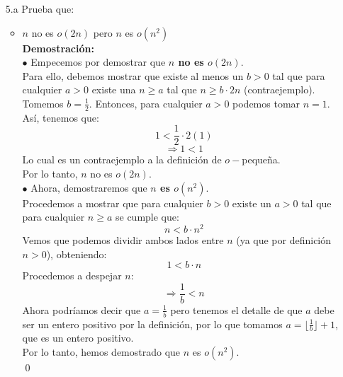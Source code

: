\documentclass[12pt]{article}
\begin{document}
\begin{itemize}
    \item[5.a] Prueba que:
    \begin{itemize}
            \item $n$ no es $o(2n)$ pero $n$ es $o(n^2)$\\
            \textbf{Demostración:}\\
            $\bullet$ Empecemos por demostrar que \textbf{$n$ no es $o(2n)$}.\\
            Para ello, debemos mostrar que existe al menos un $b > 0$ tal que para cualquier $a > 0$ existe una $n \geq a$ tal que $n \geq b \cdot 2n$ (contraejemplo).\\
            Tomemos $b = \frac{1}{2}$. Entonces, para cualquier $a > 0$ podemos tomar $n = 1$. Así, tenemos que:
            \[
            1 < \frac{1}{2} \cdot 2(1)
            \]
            \[
            \Rightarrow 1 < 1
            \]
            Lo cual es un contraejemplo a la definición de $o-$pequeña.\\
            Por lo tanto, $n$ no es $o(2n)$.\\
            $\bullet$ Ahora, demostraremos que \textbf{$n$ es $o(n^2)$}.\\
            Procedemos a mostrar que para cualquier $b > 0$ existe un $a > 0$ tal que para cualquier $n \geq a$ se cumple que:
            \[
            n < b \cdot n^2
            \]
            Vemos que podemos dividir ambos lados entre $n$ (ya que por definición $n > 0$), obteniendo:
            \[
            1 < b \cdot n
            \]
            Procedemos a despejar $n$:
            \[
            \Rightarrow \frac{1}{b} < n
            \]
            Ahora podríamos decir que $a = \frac{1}{b}$ pero tenemos el detalle de que $a$ debe ser un entero positivo por la definición, por lo que tomamos $a = \lfloor \frac{1}{b} \rfloor + 1$, que es un entero positivo.\\
            Por lo tanto, hemos demostrado que $n$ es $o(n^2)$. \\
            \qed



\end{itemize}
\end{itemize}
\end{document}
